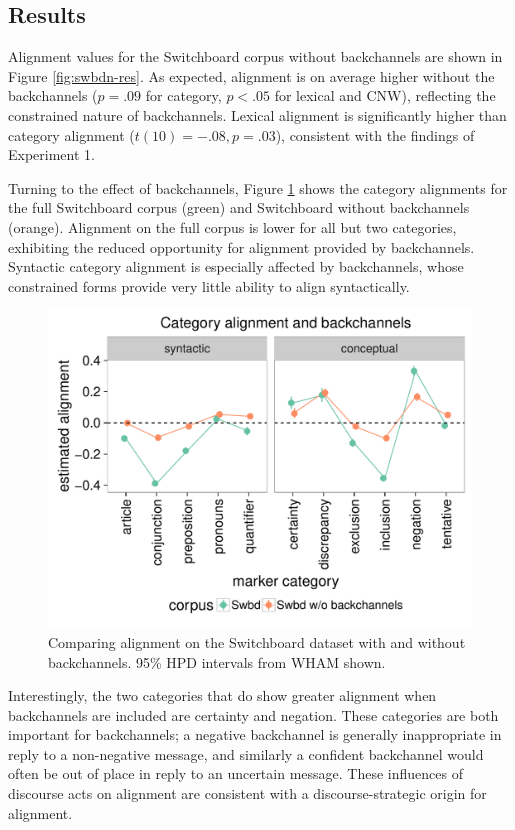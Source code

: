 \documentclass[11pt]{article}
\begin{document}
\subsection{Results}

Alignment values for the Switchboard corpus without backchannels are shown in Figure \ref{fig:swbdn-res}. As expected, alignment is on average higher without the backchannels ($p=.09$ for category, $p<.05$ for lexical and CNW), reflecting the constrained nature of backchannels. Lexical alignment is significantly higher than category alignment ($t(10) =-.08, p = .03$), consistent with the findings of Experiment 1.

Turning to the effect of backchannels, Figure \ref{fig:swbds-res} shows the category alignments for the full Switchboard corpus (green) and Switchboard without backchannels (orange). Alignment on the full corpus is lower for all but two categories, exhibiting the reduced opportunity for alignment provided by backchannels. Syntactic category alignment is especially affected by backchannels, whose constrained forms provide very little ability to align syntactically.

\begin{figure}[t]
  \begin{center}
    \includegraphics[width=\columnwidth]{results/swbds_line.pdf}
  \end{center}
  \caption{Comparing alignment on the Switchboard dataset with and without backchannels. 95\% HPD intervals from WHAM shown.}\label{fig:swbds-res}
\end{figure}

Interestingly, the two categories that do show greater alignment when backchannels are included are certainty and negation. These categories are both important for backchannels; a negative backchannel is generally inappropriate in reply to a non-negative message, and similarly a confident backchannel would often be out of place in reply to an uncertain message. These influences of discourse acts on alignment are consistent with a discourse-strategic origin for alignment.
\end{document}
